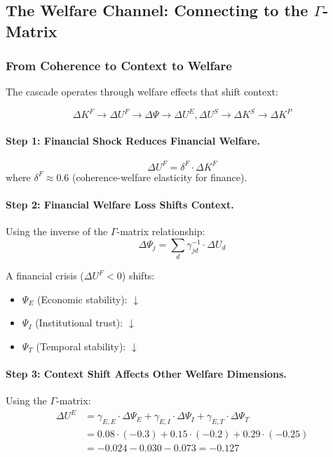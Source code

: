 \subsection{The Welfare Channel: Connecting to the $\Gamma$-Matrix}

\subsubsection{From Coherence to Context to Welfare}

The cascade operates through welfare effects that shift context:

\begin{equation}
\Delta K^F \to \Delta U^F \to \Delta \Psi \to \Delta U^E, \Delta U^S \to \Delta K^S \to \Delta K^P
\end{equation}

\paragraph{Step 1: Financial Shock Reduces Financial Welfare.}
\begin{equation}
\Delta U^F = \delta^F \cdot \Delta K^F
\end{equation}
where $\delta^F \approx 0.6$ (coherence-welfare elasticity for finance).

\paragraph{Step 2: Financial Welfare Loss Shifts Context.}
Using the inverse of the $\Gamma$-matrix relationship:
\begin{equation}
\Delta \Psi_j = \sum_d \gamma^{-1}_{jd} \cdot \Delta U_d
\end{equation}

A financial crisis ($\Delta U^F < 0$) shifts:
\begin{itemize}
    \item $\Psi_E$ (Economic stability): $\downarrow$
    \item $\Psi_I$ (Institutional trust): $\downarrow$
    \item $\Psi_T$ (Temporal stability): $\downarrow$
\end{itemize}

\paragraph{Step 3: Context Shift Affects Other Welfare Dimensions.}
Using the $\Gamma$-matrix:
\begin{align}
\Delta U^E &= \gamma_{E,E} \cdot \Delta \Psi_E + \gamma_{E,I} \cdot \Delta \Psi_I + \gamma_{E,T} \cdot \Delta \Psi_T \\
&= 0.08 \cdot (-0.3) + 0.15 \cdot (-0.2) + 0.29 \cdot (-0.25) \\
&= -0.024 - 0.030 - 0.073 = -0.127
\end{align}

